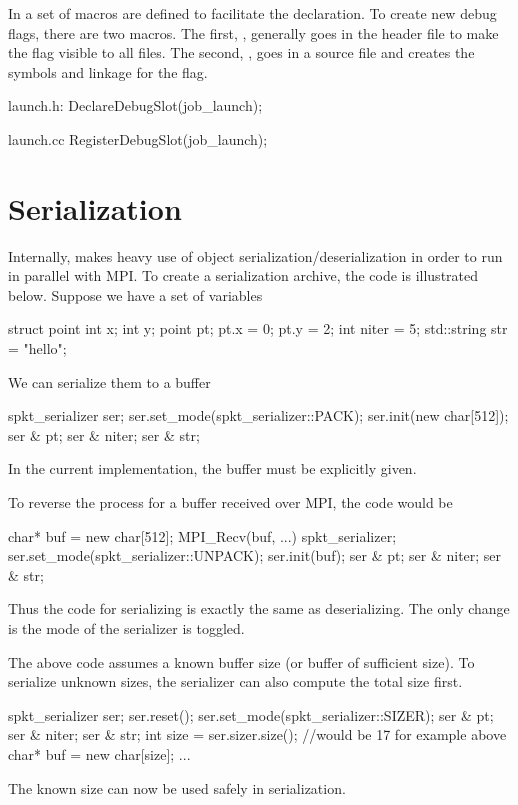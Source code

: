 In  a set of macros are defined to facilitate the declaration.
To create new debug flags, there are two macros.
The first, , generally goes in the header file to make the flag visible to all files.
The second, , goes in a source file and creates the symbols and linkage for the flag.

\begin{CppCode}
launch.h:
DeclareDebugSlot(job_launch);

launch.cc
RegisterDebugSlot(job_launch);
\end{CppCode}

\section{Serialization}\label{sec:serialize}
Internally, \sstmacro makes heavy use of object serialization/deserialization in order to run in parallel with MPI.
To create a serialization archive, the code is illustrated below. Suppose we have a set of variables

\begin{CppCode}
struct point {
 int x;
 int y;
}
point pt;
pt.x = 0;
pt.y = 2;
int niter = 5;
std::string str = "hello";
\end{CppCode}

We can serialize them to a buffer

\begin{CppCode}
spkt_serializer ser;
ser.set_mode(spkt_serializer::PACK);
ser.init(new char[512]);
ser & pt;
ser & niter;
ser & str;
\end{CppCode}
In the current implementation, the buffer must be explicitly given.

To reverse the process for a buffer received over MPI, the code would be

\begin{CppCode}
char* buf = new char[512];
MPI_Recv(buf, ...)
spkt_serializer;
ser.set_mode(spkt_serializer::UNPACK);
ser.init(buf);
ser & pt;
ser & niter;
ser & str;
\end{CppCode}

Thus the code for serializing is exactly the same as deserializing. The only change is the mode of the serializer is toggled.

The above code assumes a known buffer size (or buffer of sufficient size).
To serialize unknown sizes, the serializer can also compute the total size first.

\begin{CppCode}
spkt_serializer ser;
ser.reset();
ser.set_mode(spkt_serializer::SIZER);
ser & pt;
ser & niter;
ser & str;
int size = ser.sizer.size(); //would be 17 for example above
char* buf = new char[size];
...
\end{CppCode}
The known size can now be used safely in serialization.

